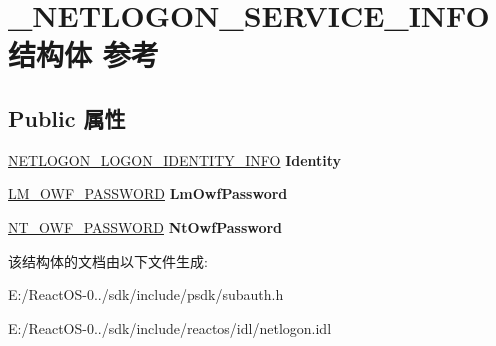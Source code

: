 \hypertarget{struct___n_e_t_l_o_g_o_n___s_e_r_v_i_c_e___i_n_f_o}{}\section{\+\_\+\+N\+E\+T\+L\+O\+G\+O\+N\+\_\+\+S\+E\+R\+V\+I\+C\+E\+\_\+\+I\+N\+F\+O结构体 参考}
\label{struct___n_e_t_l_o_g_o_n___s_e_r_v_i_c_e___i_n_f_o}
\subsection*{Public 属性}
\begin{DoxyCompactItemize}
\item 
\mbox{\label{struct___n_e_t_l_o_g_o_n___s_e_r_v_i_c_e___i_n_f_o_a039c9f461076df8c29e2b2ff5492ba22}} 
\hyperlink{struct___n_e_t_l_o_g_o_n___l_o_g_o_n___i_d_e_n_t_i_t_y___i_n_f_o}{N\+E\+T\+L\+O\+G\+O\+N\+\_\+\+L\+O\+G\+O\+N\+\_\+\+I\+D\+E\+N\+T\+I\+T\+Y\+\_\+\+I\+N\+FO} {\bfseries Identity}
\item 
\mbox{\label{struct___n_e_t_l_o_g_o_n___s_e_r_v_i_c_e___i_n_f_o_a899d2651cfd893391f4bf5fc29aee432}} 
\hyperlink{struct___l_m___o_w_f___p_a_s_s_w_o_r_d}{L\+M\+\_\+\+O\+W\+F\+\_\+\+P\+A\+S\+S\+W\+O\+RD} {\bfseries Lm\+Owf\+Password}
\item 
\mbox{\label{struct___n_e_t_l_o_g_o_n___s_e_r_v_i_c_e___i_n_f_o_a01c776c4b9a74553f62c3ce943e5e0fc}} 
\hyperlink{struct___l_m___o_w_f___p_a_s_s_w_o_r_d}{N\+T\+\_\+\+O\+W\+F\+\_\+\+P\+A\+S\+S\+W\+O\+RD} {\bfseries Nt\+Owf\+Password}
\end{DoxyCompactItemize}


该结构体的文档由以下文件生成\+:\begin{DoxyCompactItemize}
\item 
E\+:/\+React\+O\+S-\/0../sdk/include/psdk/subauth.\+h\item 
E\+:/\+React\+O\+S-\/0../sdk/include/reactos/idl/netlogon.\+idl\end{DoxyCompactItemize}
